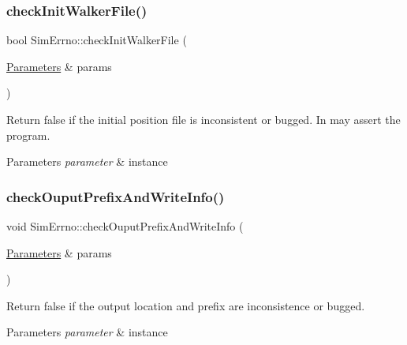 \subsubsection{\texorpdfstring{check\+Init\+Walker\+File()}{checkInitWalkerFile()}}
{\footnotesize\ttfamily bool Sim\+Errno\+::check\+Init\+Walker\+File (\begin{DoxyParamCaption}\item[{\hyperlink{class_parameters}{Parameters} \&}]{params }\end{DoxyParamCaption})\hspace{0.3cm}{\ttfamily [static]}}



Return false if the initial position file is inconsistent or bugged. In may assert the program. 


\begin{DoxyParams}{Parameters}
{\em parameter} & instance \\
\hline
\end{DoxyParams}
\mbox{\label{class_sim_errno_a195d934b873f7b10be5f57cf6f77e80f}} 
\subsubsection{\texorpdfstring{check\+Ouput\+Prefix\+And\+Write\+Info()}{checkOuputPrefixAndWriteInfo()}}
{\footnotesize\ttfamily void Sim\+Errno\+::check\+Ouput\+Prefix\+And\+Write\+Info (\begin{DoxyParamCaption}\item[{\hyperlink{class_parameters}{Parameters} \&}]{params }\end{DoxyParamCaption})\hspace{0.3cm}{\ttfamily [static]}}



Return false if the output location and prefix are inconsistence or bugged. 


\begin{DoxyParams}{Parameters}
{\em parameter} & instance \\
\hline
\end{DoxyParams}
\mbox{\label{class_sim_errno_a3a4c60541ecf163e50f70f8b9795be29}} 
